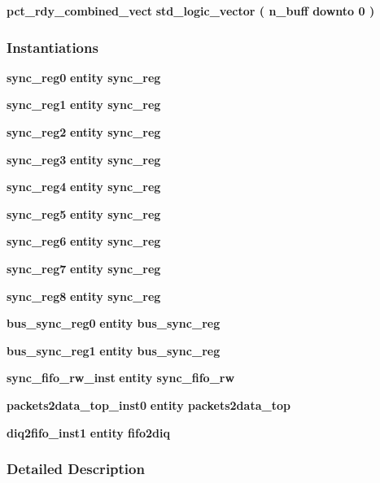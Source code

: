 \begin{DoxyCompactItemize}
\item 
{\bf pct\+\_\+rdy\+\_\+combined\+\_\+vect} {\bfseries \textcolor{comment}{std\+\_\+logic\+\_\+vector}\textcolor{vhdlchar}{ }\textcolor{vhdlchar}{(}\textcolor{vhdlchar}{ }\textcolor{vhdlchar}{ }\textcolor{vhdlchar}{ }\textcolor{vhdlchar}{ }{\bfseries {\bf n\+\_\+buff}} \textcolor{vhdlchar}{ }\textcolor{keywordflow}{downto}\textcolor{vhdlchar}{ }\textcolor{vhdlchar}{ } \textcolor{vhdldigit}{0} \textcolor{vhdlchar}{ }\textcolor{vhdlchar}{)}\textcolor{vhdlchar}{ }} 
\end{DoxyCompactItemize}
\subsubsection*{Instantiations}
 \begin{DoxyCompactItemize}
\item 
{\bf sync\+\_\+reg0}  {\bfseries entity sync\+\_\+reg}   
\item 
{\bf sync\+\_\+reg1}  {\bfseries entity sync\+\_\+reg}   
\item 
{\bf sync\+\_\+reg2}  {\bfseries entity sync\+\_\+reg}   
\item 
{\bf sync\+\_\+reg3}  {\bfseries entity sync\+\_\+reg}   
\item 
{\bf sync\+\_\+reg4}  {\bfseries entity sync\+\_\+reg}   
\item 
{\bf sync\+\_\+reg5}  {\bfseries entity sync\+\_\+reg}   
\item 
{\bf sync\+\_\+reg6}  {\bfseries entity sync\+\_\+reg}   
\item 
{\bf sync\+\_\+reg7}  {\bfseries entity sync\+\_\+reg}   
\item 
{\bf sync\+\_\+reg8}  {\bfseries entity sync\+\_\+reg}   
\item 
{\bf bus\+\_\+sync\+\_\+reg0}  {\bfseries entity bus\+\_\+sync\+\_\+reg}   
\item 
{\bf bus\+\_\+sync\+\_\+reg1}  {\bfseries entity bus\+\_\+sync\+\_\+reg}   
\item 
{\bf sync\+\_\+fifo\+\_\+rw\+\_\+inst}  {\bfseries entity sync\+\_\+fifo\+\_\+rw}   
\item 
{\bf packets2data\+\_\+top\+\_\+inst0}  {\bfseries entity packets2data\+\_\+top}   
\item 
{\bf diq2fifo\+\_\+inst1}  {\bfseries entity fifo2diq}   
\end{DoxyCompactItemize}


\subsubsection{Detailed Description}


